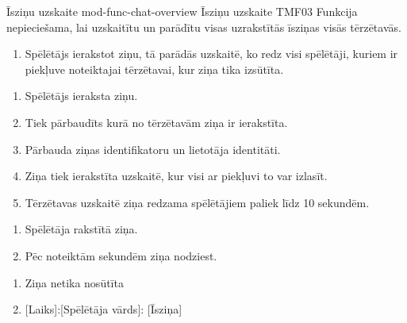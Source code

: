 \moduleFunctionTable
{Īsziņu uzskaite}
{mod-func-chat-overview}
{Īsziņu uzskaite}
{TMF03}
{
	Funkcija nepieciešama, lai uzskaitītu un parādītu visas uzrakstītās īsziņas visās tērzētavās.
}
{
	\begin{enumerate}
		\item Spēlētājs ierakstot ziņu, tā parādās uzskaitē, ko redz visi spēlētāji, kuriem ir piekļuve noteiktajai tērzētavai, kur ziņa tika izsūtīta.
	\end{enumerate}
}
{
	\begin{enumerate}
		\item Spēlētājs ieraksta ziņu.
		\item Tiek pārbaudīts kurā no tērzētavām ziņa ir ierakstīta.
		\item Pārbauda ziņas identifikatoru un lietotāja identitāti.
		\item Ziņa tiek ierakstīta uzskaitē, kur visi ar piekļuvi to var izlasīt.
		\item Tērzētavas uzskaitē ziņa redzama spēlētājiem paliek līdz 10 sekundēm.
	\end{enumerate}
}
{
	\begin{enumerate}
		\item Spēlētāja rakstītā ziņa.
		\item Pēc noteiktām sekundēm ziņa nodziest.
	\end{enumerate}
}
{
	\begin{enumerate}
		\item Ziņa netika nosūtīta
		\item {}[Laiks]:[Spēlētāja vārds]: [Īsziņa]
	\end{enumerate}
}

